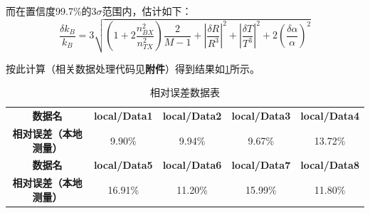 \begin{enumerate}
\begin{ubox}{}
		而在置信度99.7\%的3$\sigma$范围内，估计如下：
		$$
		\frac{\delta k_B}{k_B} = 3\sqrt{\left(1 + 2\frac{n_{BX}^2}{n_{TX}^2}\right)\frac{2}{M-1} + \left|\frac{\delta R}{R^3}\right|^2 + \left|\frac{\delta T}{T^3}\right|^2 + 2(\frac{\delta \alpha}{\alpha})^2}
		$$
		
		按此计算（相关数据处理代码见\textbf{附件}）得到结果如\cref{tab:relative_error}所示。
		
	\end{ubox}
	
	\begin{table}[h!]
		\centering
		\renewcommand{\arraystretch}{1.5} %
		\caption{相对误差数据表}
		\label{tab:relative_error}
		\begin{tabular}{|ccccc|}
			\hline
			\textbf{数据名} & \textbf{local/Data1} & \textbf{local/Data2} & \textbf{local/Data3} & \textbf{local/Data4}  \\ 
			\textbf{相对误差（本地测量）} & 9.90\% & 9.94\% & 9.67\% & 13.72\% \\ 
			\hline
			\textbf{数据名} & \textbf{local/Data5} & \textbf{local/Data6} & \textbf{local/Data7} & \textbf{local/Data8} \\
			\textbf{相对误差（本地测量）}& 16.91\% & 11.20\% & 15.99\% & 11.80\% \\
			\hline
		\end{tabular}
	\end{table}
	
\end{enumerate}

